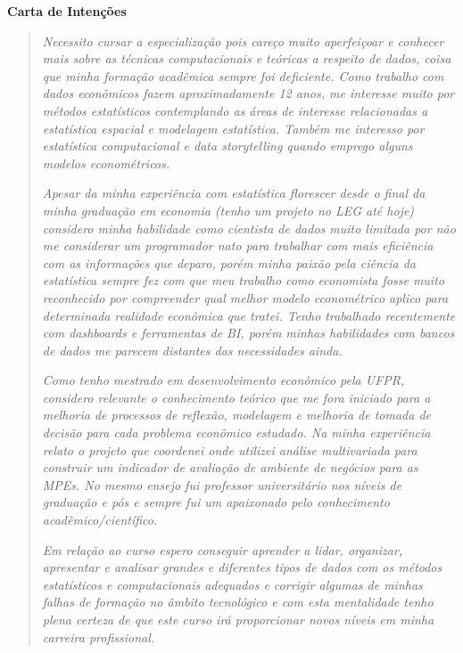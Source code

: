 \documentclass{article}
\begin{document}
\vspace{-5cm}

\begin{center}
\textbf{Carta de Intenções}
\end{center}

\begin{quote}
\textit{Necessito cursar a especialização pois careço muito aperfeiçoar e conhecer mais sobre as técnicas computacionais e teóricas a respeito de dados, coisa que minha formação acadêmica sempre foi deficiente. Como trabalho com dados econômicos fazem aproximadamente 12 anos, me interesse muito por métodos estatísticos contemplando as áreas de interesse relacionadas a estatística espacial e modelagem estatística. Também me interesso por estatística computacional e data storytelling quando emprego alguns modelos econométricos. }

\textit{Apesar da minha experiência com estatística florescer desde o final da minha graduação em economia (tenho um projeto no LEG até hoje) considero minha habilidade como cientista de dados muito limitada por não me considerar um programador nato para trabalhar com mais eficiência com as informações que deparo, porém minha paixão pela ciência da estatística sempre fez com que meu trabalho como economista fosse muito reconhecido por compreender qual melhor modelo econométrico aplico para determinada realidade econômica que tratei. Tenho trabalhado recentemente com dashboards e ferramentas de BI, porém minhas habilidades com bancos de dados me parecem distantes das necessidades ainda.}

\textit{Como tenho mestrado em desenvolvimento econômico pela UFPR, considero relevante o conhecimento teórico que me fora iniciado para a melhoria de processos de reflexão, modelagem e melhoria de tomada de decisão para cada problema econômico estudado. Na minha experiência relato o projeto que coordenei onde utilizei análise multivariada para construir um indicador de avaliação de ambiente de negócios para as MPEs. No mesmo ensejo fui professor universitário nos níveis de graduação e pós e sempre fui um apaixonado pelo conhecimento acadêmico/científico.}

\textit{Em relação ao curso espero conseguir aprender a lidar, organizar, apresentar e analisar grandes e diferentes tipos de dados com os métodos estatísticos e computacionais adequados e corrigir algumas de minhas falhas de formação no âmbito tecnológico e com esta mentalidade tenho plena certeza de que este curso irá proporcionar novos níveis em minha carreira profissional.}
\end{quote}
    
\end{document}
